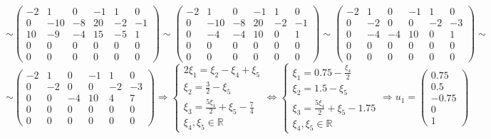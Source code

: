 \documentclass{article}
\begin{document}
$$\sim \left(\begin{array}{ccccc|c}
-2 & 1 & 0 & -1 & 1 & 0 \\
0 & -10 & -8 & 20 & -2 & -1 \\
10 & -9 & -4 & 15 & -5 & 1 \\
0 & 0 & 0 & 0 & 0 & 0 \\
0 & 0 & 0 & 0 & 0 & 0
\end{array}\right)\sim \left(\begin{array}{ccccc|c}
-2 & 1 & 0 & -1 & 1 & 0 \\
0 & -10 & -8 & 20 & -2 & -1 \\
0 & -4 & -4 & 10 & 0 & 1 \\
0 & 0 & 0 & 0 & 0 & 0 \\
0 & 0 & 0 & 0 & 0 & 0
\end{array}\right)\sim \left(\begin{array}{ccccc|c}
-2 & 1 & 0 & -1 & 1 & 0 \\
0 & -2 & 0 & 0 & -2 & -3 \\
0 & -4 & -4 & 10 & 0 & 1 \\
0 & 0 & 0 & 0 & 0 & 0 \\
0 & 0 & 0 & 0 & 0 & 0
\end{array}\right) \sim$$
$$\sim \left(\begin{array}{ccccc|c}
-2 & 1 & 0 & -1 & 1 & 0 \\
0 & -2 & 0 & 0 & -2 & -3 \\
0 & 0 & -4 & 10 & 4 & 7 \\
0 & 0 & 0 & 0 & 0 & 0 \\
0 & 0 & 0 & 0 & 0 & 0
\end{array}\right) \Rightarrow \begin{cases}
2\xi_1 = \xi_2-\xi_4+\xi_5 \\
\xi_2 = \frac{3}{2}-\xi_5 \\
\xi_3 = \frac{5\xi_4}{2}+\xi_5-\frac{7}{4} \\
\xi_4, \xi_5 \in \mathbb{R}
\end{cases} \Leftrightarrow \begin{cases}
\xi_1 = 0.75-\frac{\xi_4}{2} \\
\xi_2 = 1.5-\xi_5 \\
\xi_3 = \frac{5\xi_4}{2}+\xi_5-1.75 \\
\xi_4, \xi_5 \in \mathbb{R}
\end{cases} \Rightarrow u_1 = \begin{pmatrix}0.75 \\ 0.5 \\ -0.75 \\ 0 \\ 1\end{pmatrix}$$
\end{document}
